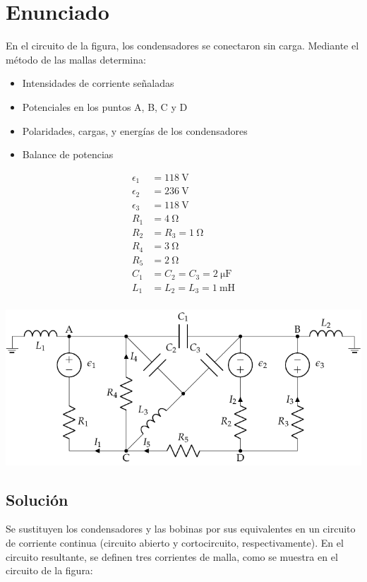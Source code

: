 \section{Enunciado}
En el circuito de la figura, los condensadores se conectaron sin
carga. Mediante el método de las mallas determina:
\begin{itemize}
\item Intensidades de corriente señaladas
\item Potenciales en los puntos A, B, C y D
\item Polaridades, cargas, y energías de los condensadores
\item Balance de potencias
\end{itemize}
\begin{minipage}[c]{0.3\linewidth}
  \begin{align*}
    \epsilon_{1}&=\qty{118}{\volt}\\
    \epsilon_{2}&=\qty{236}{\volt}\\
    \epsilon_{3}&=\qty{118}{\volt}\\
    R_{1}&= \qty{4}{\ohm}\\
    R_{2}&=R_{3}=\qty{1}{\ohm}\\
    R_{4}&= \qty{3}{\ohm}\\
    R_{5}&= \qty{2}{\ohm}\\
    C_{1}&=C_{2}=C_{3}=\qty{2}{\micro\farad}\\
    L_1 &= L_2 = L_3 = \qty{1}{\milli\henry}\\
  \end{align*}
\end{minipage}
\begin{minipage}[c]{0.7\linewidth}
  \includegraphics{figuras/mallas_condensadores.pdf}
\end{minipage}

\subsection*{Solución}
Se sustituyen los condensadores y las bobinas por sus equivalentes en un circuito de corriente continua (circuito abierto y cortocircuito, respectivamente). En el circuito resultante, se definen tres corrientes de malla, como se muestra en el circuito de la figura:

